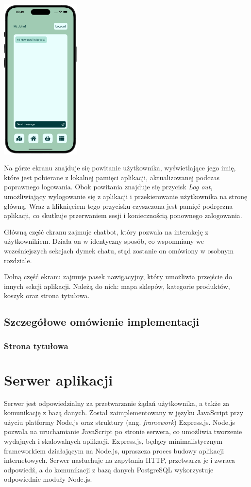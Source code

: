 \begin{center}
    \includegraphics[width=0.3\textwidth]{images/front/user_page.png}
\end{center}

Na górze ekranu znajduje się powitanie użytkownika, wyświetlające jego imię, które jest pobierane z lokalnej pamięci aplikacji, aktualizowanej podczas poprawnego logowania. Obok powitania znajduje się przycisk \textit{Log out}, umożliwiający wylogowanie się z aplikacji i przekierowanie użytkownika na stronę główną. Wraz z kliknięciem tego przycisku czyszczona jest pamięć podręczna aplikacji, co skutkuje przerwaniem sesji i koniecznością ponownego zalogowania.

Główną część ekranu zajmuje chatbot, który pozwala na interakcję z użytkownikiem. Działa on w identyczny sposób, co wspomniany we wcześniejszych sekcjach dymek chatu, stąd zostanie on omówiony w osobnym rozdziale.

Dolną część ekranu zajmuje pasek nawigacyjny, który umożliwia przejście do innych sekcji aplikacji. Należą do nich: mapa sklepów, kategorie produktów, koszyk oraz strona tytułowa.


\subsection{Szczegółowe omówienie implementacji}
\subsubsection{Strona tytułowa}


\section{Serwer aplikacji}
Serwer jest odpowiedzialny za przetwarzanie żądań użytkownika, a także za komunikację z bazą danych. Został zaimplementowany w języku JavaScript przy użyciu platformy Node.js oraz struktury (ang. \textit{framework}) Express.js. Node.js pozwala na uruchamianie JavaScript po stronie serwera, co umożliwia tworzenie wydajnych i skalowalnych aplikacji. Express.js, będący minimalistycznym frameworkiem działającym na Node.js, upraszcza proces budowy aplikacji internetowych. Serwer nasłuchuje na zapytania HTTP, przetwarza je i zwraca odpowiedź, a do komunikacji z bazą danych PostgreSQL wykorzystuje odpowiednie moduły Node.js.


